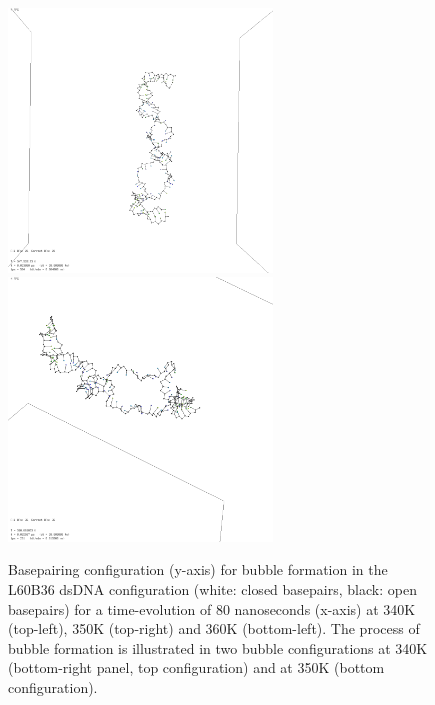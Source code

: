 \begin{figure}[h] \begin{minipage}{7cm}
 \end{minipage} \begin{minipage}{7cm}  \end{minipage}
\begin{minipage}{8cm}
 \end{minipage} \begin{minipage}{6cm}
\includegraphics[width=7cm]{images/L60B36_bubble2.png}\\
\includegraphics[width=7cm]{images/L60B36_bubble1.png} \end{minipage}
\begin{center}
\caption{Basepairing configuration (y-axis) for bubble formation in the L60B36 dsDNA configuration (white: closed basepairs, black: open basepairs) for a time-evolution of 80 nanoseconds (x-axis) at 340K (top-left), 350K (top-right) and 360K (bottom-left). The process of bubble formation is illustrated in two bubble configurations at 340K (bottom-right panel, top configuration) and at 350K (bottom configuration). }
\end{center}
\end{figure}





